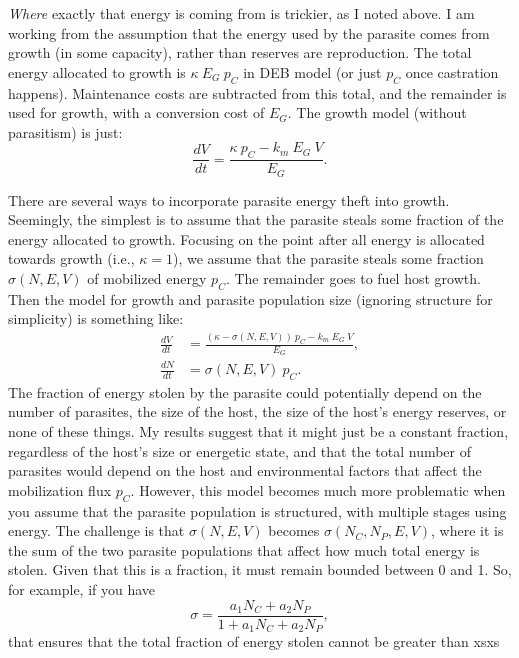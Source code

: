 \documentclass[11pt,reqno,final,pdftex]{amsart}\usepackage[]{graphicx}\usepackage[]{color}
\theoremstyle{plain}
\numberwithin{equation}{part}
\begin{document}
\emph{Where} exactly that energy is coming from is trickier, as I noted above.
I am working from the assumption that the energy used by the parasite comes from growth (in some capacity), rather than reserves are reproduction.
The total energy allocated to growth is $\kappa~E_G~p_C$ in DEB model (or just $p_C$ once castration happens).
Maintenance costs are subtracted from this total, and the remainder is used for growth, with a conversion cost of $E_G$.
The growth model (without parasitism) is just:
\begin{equation}
\frac{dV}{dt} = \frac{\kappa~p_C - k_m~E_G~V}{E_G}.
\end{equation}

There are several ways to incorporate parasite energy theft into growth.
Seemingly, the simplest is to assume that the parasite steals some fraction of the energy allocated to growth.
Focusing on the point after all energy is allocated towards growth (i.e., $\kappa=1$), we assume that the parasite steals some fraction $\sigma(N,E,V)$ of mobilized energy $p_C$. The remainder goes to fuel host growth. Then the model for growth and parasite population size (ignoring structure for simplicity) is something like:
\begin{align}
\frac{dV}{dt} &= \frac{(\kappa-\sigma(N,E,V))~p_C - k_m~E_G~V}{E_G}, \\
\frac{dN}{dt} &= \sigma(N,E,V)~p_C.
\end{align}
The fraction of energy stolen by the parasite could potentially depend on the number of parasites, the size of the host, the size of the host's energy reserves, or none of these things.
My results suggest that it might just be a constant fraction, regardless of the host's size or energetic state, and that the total number of parasites would depend on the host and environmental factors that affect the mobilization flux $p_C$.
However, this model becomes much more problematic when you assume that the parasite population is structured, with multiple stages using energy.
The challenge is that $\sigma(N,E,V)$ becomes $\sigma(N_C, N_P, E, V)$, where it is the sum of the two parasite populations that affect how much total energy is stolen.
Given that this is a fraction, it must remain bounded between 0 and 1.
So, for example, if you have
\begin{equation}
\sigma = \frac{a_1 N_C + a_2 N_P}{1 + a_1 N_C + a_2 N_P},
\end{equation}
that ensures that the total fraction of energy stolen cannot be greater than xsxs
\end{document}
